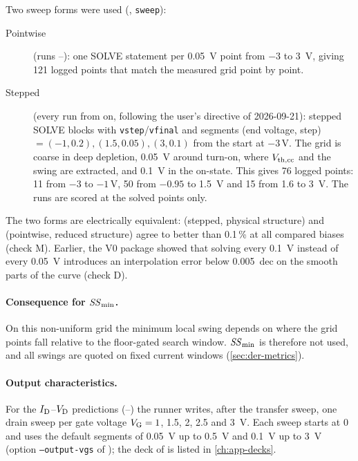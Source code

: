 Two sweep forms were used (, \texttt{sweep}):
\begin{description}
  \item[Pointwise] (runs --): one SOLVE statement per \SI{0.05}{V} point from $-3$ to \SI{3}{V},
        giving 121 logged points that match the measured grid point by point.
  \item[Stepped] (every run from  on, following the user's directive of 2026-09-21): stepped SOLVE blocks
        with \texttt{vstep}/\texttt{vfinal} and segments (end voltage, step) $= (-1, 0.2), (1.5, 0.05), (3, 0.1)$ from
        the start at $-3$\,V. The grid is coarse in deep depletion, \SI{0.05}{V} around turn-on, where $V_{\mathrm{th,cc}}$ and the
        swing are extracted, and \SI{0.1}{V} in the on-state. This gives 76 logged points: 11 from $-3$ to $-1$\,V, 50
        from $-0.95$ to \SI{1.5}{V} and 15 from 1.6 to \SI{3}{V}. The runs are scored at the solved points only.
\end{description}
The two forms are electrically equivalent:  (stepped, physical structure) and  (pointwise, reduced
structure) agree to better than 0.1\,\% at all compared biases (check M). Earlier, the V0 package showed that solving
every \SI{0.1}{V} instead of every \SI{0.05}{V} introduces an interpolation error below \SI{0.005}{dec} on the smooth
parts of the curve (check D).

\paragraph{Consequence for $\mathit{SS}_{\min}$.} On this non-uniform grid the minimum local swing depends on where the grid points
fall relative to the floor-gated search window. $\mathit{SS}_{\min}$ is therefore not used, and all swings are quoted on fixed
current windows (\cref{sec:der-metrics}).

\paragraph{Output characteristics.} For the $I_{\mathrm{D}}$--$V_{\mathrm{D}}$ predictions (--) the runner writes, after
the transfer sweep, one drain sweep per gate voltage $V_{\mathrm{G}} = 1$, 1.5, 2, 2.5 and \SI{3}{V}. Each sweep starts at 0 and
uses the default segments of \SI{0.05}{V} up to \SI{0.5}{V} and \SI{0.1}{V} up to \SI{3}{V} (option
\texttt{--output-vgs} of ); the deck of  is listed in \cref{ch:app-decks}.

